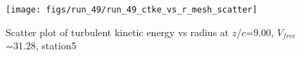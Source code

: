 \begin{figure}[H]
\centering
\texttt{[image: figs/run\_49/run\_49\_ctke\_vs\_r\_mesh\_scatter]}
\caption{Scatter plot of turbulent kinetic energy vs radius at $z/c$=9.00, $V_{free}$=31.28, station5}
\label{fig:run_49_ctke_vs_r_mesh_scatter}
\end{figure}


